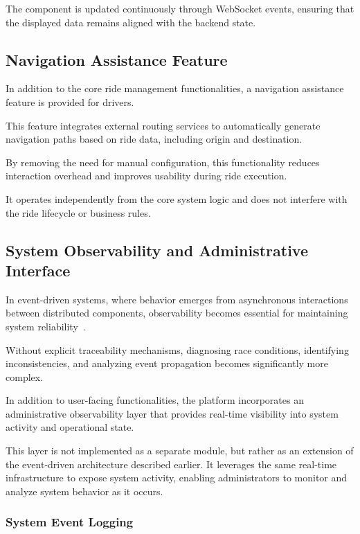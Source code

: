 The component is updated continuously through WebSocket events, ensuring that the displayed data remains aligned with the backend state.

\subsection{Navigation Assistance Feature}

In addition to the core ride management functionalities, a navigation assistance feature is provided for drivers.

This feature integrates external routing services to automatically generate navigation paths based on ride data, including origin and destination.

By removing the need for manual configuration, this functionality reduces interaction overhead and improves usability during ride execution.

It operates independently from the core system logic and does not interfere with the ride lifecycle or business rules.

\subsection{System Observability and Administrative Interface}

In event-driven systems, where behavior emerges from asynchronous interactions between distributed components, observability becomes essential for maintaining system reliability~\cite{event_driven_architecture}.

Without explicit traceability mechanisms, diagnosing race conditions, identifying inconsistencies, and analyzing event propagation becomes significantly more complex.

In addition to user-facing functionalities, the platform incorporates an administrative observability layer that provides real-time visibility into system activity and operational state.

This layer is not implemented as a separate module, but rather as an extension of the event-driven architecture described earlier. It leverages the same real-time infrastructure to expose system activity, enabling administrators to monitor and analyze system behavior as it occurs.

\subsubsection{System Event Logging}


